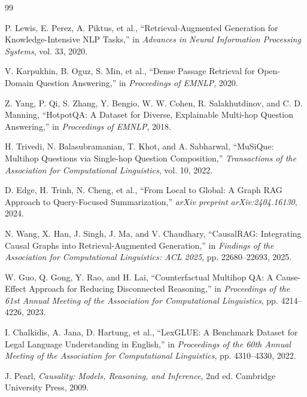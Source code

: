 \begin{thebibliography}{99}

P. Lewis, E. Perez, A. Piktus, et al.,
``Retrieval-Augmented Generation for Knowledge-Intensive NLP Tasks,''
in \textit{Advances in Neural Information Processing Systems},
vol. 33, 2020.

V. Karpukhin, B. Oguz, S. Min, et al.,
``Dense Passage Retrieval for Open-Domain Question Answering,''
in \textit{Proceedings of EMNLP}, 2020.

Z. Yang, P. Qi, S. Zhang, Y. Bengio, W. W. Cohen,
R. Salakhutdinov, and C. D. Manning,
``HotpotQA: A Dataset for Diverse, Explainable Multi-hop
Question Answering,''
in \textit{Proceedings of EMNLP}, 2018.

H. Trivedi, N. Balasubramanian, T. Khot, and A. Sabharwal,
``MuSiQue: Multihop Questions via Single-hop Question Composition,''
\textit{Transactions of the Association for Computational Linguistics},
vol. 10, 2022.

D. Edge, H. Trinh, N. Cheng, et al.,
``From Local to Global: A Graph RAG Approach to
Query-Focused Summarization,''
\textit{arXiv preprint arXiv:2404.16130}, 2024.

N. Wang, X. Han, J. Singh, J. Ma, and V. Chaudhary,
``CausalRAG: Integrating Causal Graphs into
Retrieval-Augmented Generation,''
in \textit{Findings of the Association for Computational Linguistics:
ACL 2025}, pp. 22680--22693, 2025.

W. Guo, Q. Gong, Y. Rao, and H. Lai,
``Counterfactual Multihop QA: A Cause-Effect Approach for
Reducing Disconnected Reasoning,''
in \textit{Proceedings of the 61st Annual Meeting of the
Association for Computational Linguistics},
pp. 4214--4226, 2023.

I. Chalkidis, A. Jana, D. Hartung, et al.,
``LexGLUE: A Benchmark Dataset for Legal Language
Understanding in English,''
in \textit{Proceedings of the 60th Annual Meeting of the
Association for Computational Linguistics},
pp. 4310--4330, 2022.

J. Pearl,
\textit{Causality: Models, Reasoning, and Inference},
2nd ed. Cambridge University Press, 2009.


\end{thebibliography}
